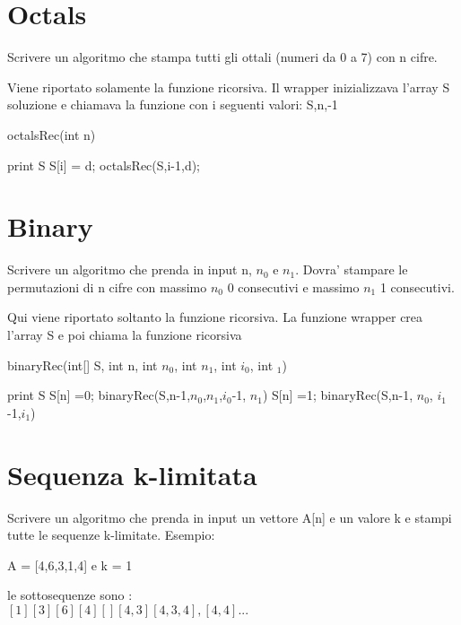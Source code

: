 \documentclass[oneside]{book}
\begin{document}
\newpage
\section{Octals}
Scrivere un algoritmo che stampa tutti gli ottali (numeri da 0 a 7) con n cifre.

Viene riportato solamente la funzione ricorsiva. Il wrapper inizializzava l'array S soluzione e chiamava la funzione con i seguenti valori: S,n,-1

\begin{algorithm}
\caption{octalsRec(int n)\label{alg:cap}}
\begin{algorithmic}
	\State print S
\Else
			\State S[i] = d;
			\State octalsRec(S,i-1,d);
		\EndIf
	\EndFor
\EndIf

\end{algorithmic}
\end{algorithm}

\newpage
\section{Binary}
Scrivere un algoritmo che prenda in input n, $n_0$ e $n_1$. Dovra' stampare le permutazioni di n cifre con massimo $n_0$ 0 consecutivi e massimo $n_1$ 1 consecutivi. 

Qui viene riportato soltanto la funzione ricorsiva. La funzione wrapper crea l'array S e poi chiama la funzione ricorsiva 
\begin{algorithm}
\caption{binaryRec(int[] S, int n, int $n_0$, int $n_1$, int $i_0$, int $_1$)}
\begin{algorithmic}
	\State print S
\EndIf
{}
	\State S[n] =0;
	\State binaryRec(S,n-1,$n_0$,$n_1$,$i_0$-1, $n_1$)
\EndIf
{}
	\State S[n] =1;
	\State binaryRec(S,n-1, $n_0$, $i_1$-1,$i_1$)
\EndIf	
\end{algorithmic}
\end{algorithm}
\newpage
\section{Sequenza k-limitata}
Scrivere un algoritmo che prenda in input un vettore A[n] e un valore k e stampi tutte le sequenze k-limitate. Esempio: 

A = [4,6,3,1,4] e k = 1

le sottosequenze sono :\\
$[1][3][6][4][][4,3][4,3,4],[4,4] ...$
\end{document}
